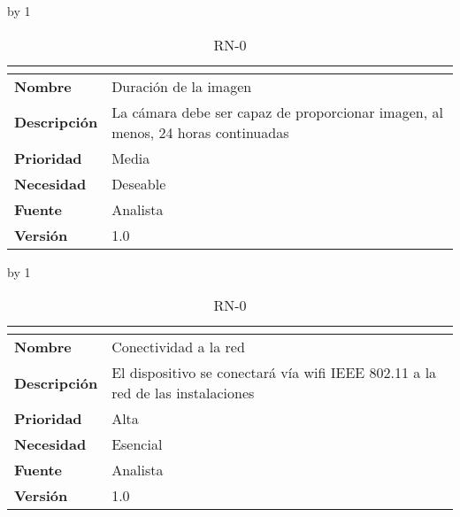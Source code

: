 \advance\rn by 1
\begin{table}[H]
	\caption{RN-0\number\rn}
	\begin{tabular}{|l|p{}|}
		\hline
		\multicolumn{2}{|c|}{\cellcolor[HTML]{BFBFBF}{\color[HTML]{000000} \textbf{RN-0\number\rn}}} \\ \hline
		\textbf{Nombre}      & Duración de la imagen                                                           \\ \hline
		\textbf{Descripción} & La cámara debe ser capaz de proporcionar imagen, al menos, 24 horas continuadas \\ \hline
		\textbf{Prioridad}   & Media                                                                           \\ \hline
		\textbf{Necesidad}   & Deseable                                                                        \\ \hline
		\textbf{Fuente}      & Analista                                                                        \\ \hline
		\textbf{Versión}     & 1.0                                                                             \\ \hline
	\end{tabular}
\end{table}
\advance\rn by 1
\begin{table}[H]
	\caption{RN-0\number\rn}
	\begin{tabular}{|l|p{}|}
		\hline
		\multicolumn{2}{|c|}{\cellcolor[HTML]{BFBFBF}{\color[HTML]{000000} \textbf{RN-0\number\rn}}} \\ \hline
		\textbf{Nombre}      & Conectividad a la red                                                          \\ \hline
		\textbf{Descripción} & El dispositivo se conectará vía wifi IEEE 802.11 a la red de las instalaciones \\ \hline
		\textbf{Prioridad}   & Alta                                                                           \\ \hline
		\textbf{Necesidad}   & Esencial                                                                       \\ \hline
		\textbf{Fuente}      & Analista                                                                       \\ \hline
		\textbf{Versión}     & 1.0                                                                            \\ \hline
	\end{tabular}
\end{table}
